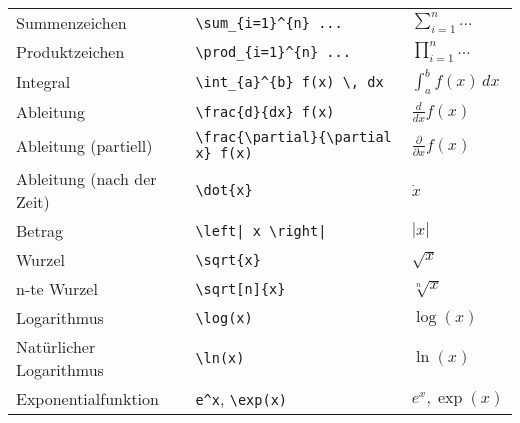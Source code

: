 \begin{longtable}{l l l}
    \midrule
    Summenzeichen             & \texttt{\textbackslash sum\_\{i=1\}\^{}\{n\} ...}                                       & $ \sum_{i=1}^{n} ... $               \\
    Produktzeichen            & \texttt{\textbackslash prod\_\{i=1\}\^{}\{n\} ...}                                      & $ \prod_{i=1}^{n} ... $              \\
    Integral                  & \texttt{\textbackslash int\_\{a\}\^{}\{b\} f(x) \textbackslash, dx}                     & $ \int_{a}^{b} f(x) \,dx $           \\
    Ableitung                 & \texttt{\textbackslash frac\{d\}\{dx\} f(x)}                                            & $ \frac{d}{dx} f(x) $                \\
    Ableitung (partiell)      & \texttt{\textbackslash frac\{\textbackslash partial\}\{\textbackslash partial x\} f(x)} & $ \frac{\partial}{\partial x} f(x) $ \\
    Ableitung (nach der Zeit) & \texttt{\textbackslash dot\{x\}}                                                        & $ \dot{x} $                          \\

    \midrule
    Betrag                    & \texttt{\textbackslash left| x \textbackslash right|}                                   & $ \left| x \right| $                 \\
    Wurzel                    & \texttt{\textbackslash sqrt\{x\}}                                                       & $ \sqrt{x} $                         \\
    n-te Wurzel               & \texttt{\textbackslash sqrt[n]\{x\}}                                                    & $ \sqrt[n]{x} $                      \\
    Logarithmus               & \texttt{\textbackslash log{(x)}}                                                        & $ \log{(x)} $                        \\
    Natürlicher Logarithmus   & \texttt{\textbackslash ln{(x)}}                                                         & $ \ln{(x)} $                         \\
    Exponentialfunktion       & \texttt{e\^{}x}, \texttt{\textbackslash exp{(x)}}                                       & $ e^x, \exp{(x)} $                   \\


\end{longtable}
